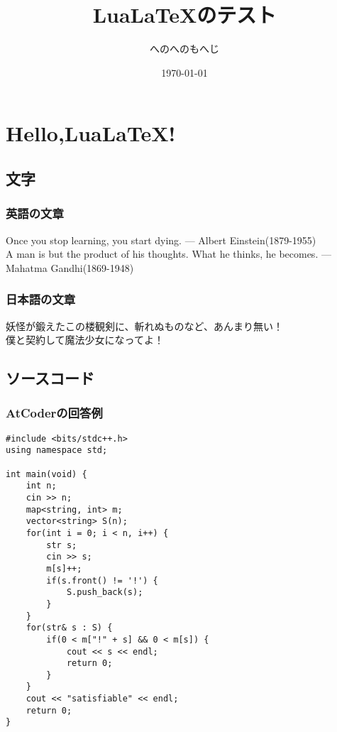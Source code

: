 \documentclass[report,a4paper,titlepage]{jlreq}
\begin{document}
\title{Lua\LaTeX のテスト}
\author{へのへのもへじ}
\date{\today}
\maketitle

\chapter{Hello,Lua\LaTeX !}
\section{文字}
\subsection{英語の文章}
\noindent
Once you stop learning, you start dying. --- Albert Einstein(1879-1955)\\
\textsf{A man is but the product of his thoughts. What he thinks, he becomes.
    ---　Mahatma Gandhi(1869-1948)}
\subsection{日本語の文章}
\noindent
妖怪が鍛えたこの楼観剣に、斬れぬものなど、あんまり無い！\\
{\sffamily 僕と契約して魔法少女になってよ！}\\

\section{ソースコード}
\subsection{AtCoderの回答例}
\begin{lstlisting}[caption = ABC187 C問題回答例(C++)]
#include <bits/stdc++.h>
using namespace std;

int main(void) {
	int n;
	cin >> n;
	map<string, int> m;
	vector<string> S(n);
	for(int i = 0; i < n, i++) {
		str s;
		cin >> s;
		m[s]++;
		if(s.front() != '!') {
			S.push_back(s);
		}
	}
	for(str& s : S) {
		if(0 < m["!" + s] && 0 < m[s]) {
			cout << s << endl;
			return 0;
		}
	}
	cout << "satisfiable" << endl;
	return 0;
}
\end{lstlisting}
\end{document}
